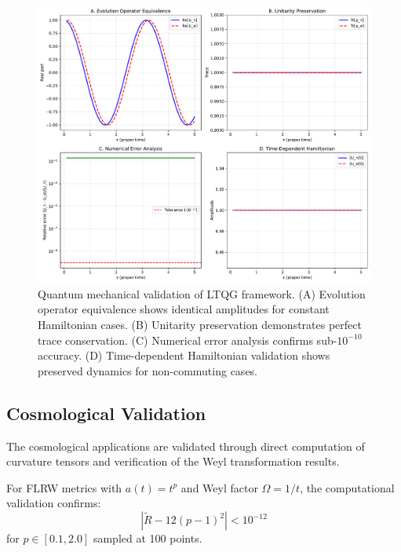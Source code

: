 \begin{figure}[htbp]
\centering
\includegraphics[width=\textwidth]{ltqg_quantum_validation.pdf}
\caption{Quantum mechanical validation of LTQG framework. (A) Evolution operator equivalence shows identical amplitudes for constant Hamiltonian cases. (B) Unitarity preservation demonstrates perfect trace conservation. (C) Numerical error analysis confirms sub-$10^{-10}$ accuracy. (D) Time-dependent Hamiltonian validation shows preserved dynamics for non-commuting cases.}
\label{fig:quantum_validation}
\end{figure}

\subsection{Cosmological Validation}
\label{subsec:cosmological_computational_validation}

The cosmological applications are validated through direct computation of curvature tensors and verification of the Weyl transformation results.

\begin{theorem}
\label{thm:curvature_regularization_validation}
For FLRW metrics with $a(t) = t^p$ and Weyl factor $\Omega = 1/t$, the computational validation confirms:
\begin{equation}
|\tilde{R} - 12(p-1)^2| < 10^{-12}
\end{equation}
for $p \in [0.1, 2.0]$ sampled at 100 points.
\end{theorem}

